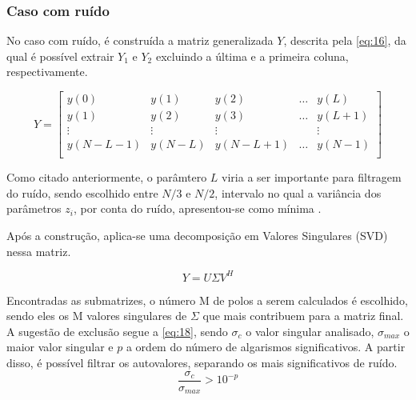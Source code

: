 \documentclass[12pt]{article}
\begin{document}
\subsubsection{Caso com ruído} \label{sec:ruido}

No caso com ruído, é construída a matriz generalizada $Y$, descrita pela \autoref{eq:16}, da qual é possível extrair $Y_1$ e $Y_2$ excluindo a 
última e a primeira coluna, respectivamente. 

\begin{equation} \label{eq:16}
    Y = \begin{bmatrix} y(0) &y(1) & y(2) & \dots & y(L) \\
                        y(1) & y(2) & y(3) & \dots & y(L + 1) \\
                        \vdots & \vdots & \vdots & & \vdots \\
                        y(N - L -1) & y(N-L) & y(N - L + 1) & \dots & y(N-1) \\
    \end{bmatrix}
\end{equation}

Como citado anteriormente, o parâmtero $L$ viria a ser importante para filtragem do ruído, sendo escolhido entre $N/3$ e $N/2$, intervalo no qual 
a variância dos parâmetros $z_i$, por conta do ruído, apresentou-se como mínima \cite{370583}.

Após a construção, aplica-se uma decomposição em Valores Singulares (SVD) nessa matriz. 

\begin{equation} \label{eq:17}
    Y = U \Sigma V^H
\end{equation}


Encontradas as submatrizes, o número M de polos a serem calculados é escolhido, sendo eles os M valores singulares de $\Sigma$ que mais contribuem para a matriz final. 
A sugestão de exclusão segue a \autoref{eq:18}, sendo $\sigma_c$ o valor singular analisado, $\sigma _{max}$ o maior valor singular e $p$ a ordem do número de algarismos significativos. 
A partir disso, é possível filtrar os autovalores, separando os mais significativos de ruído.
\begin{equation} \label{eq:18}
    \frac{\sigma_c}{\sigma _{max}} > 10^{-p}
\end{equation}
\end{document}
